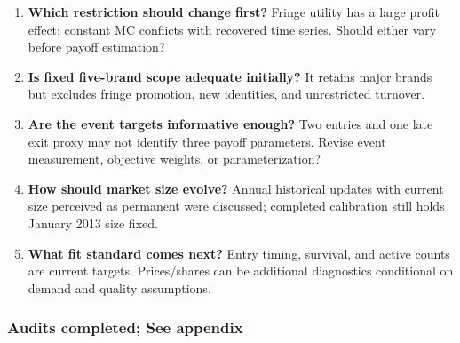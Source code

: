\documentclass[11pt,]{article}
\providecommand{\tightlist}{%
  \setlength{\itemsep}{0pt}\setlength{\parskip}{0pt}}
\begin{document}
\begin{enumerate}
\def\labelenumi{\arabic{enumi}.}
\tightlist
\item
  \textbf{Which restriction should change first?} Fringe utility has a
  large profit effect; constant MC conflicts with recovered time series.
  Should either vary before payoff estimation?
\item
  \textbf{Is fixed five-brand scope adequate initially?} It retains
  major brands but excludes fringe promotion, new identities, and
  unrestricted turnover.
\item
  \textbf{Are the event targets informative enough?} Two entries and one
  late exit proxy may not identify three payoff parameters. Revise event
  measurement, objective weights, or parameterization?
\item
  \textbf{How should market size evolve?} Annual historical updates with
  current size perceived as permanent were discussed; completed
  calibration still holds January 2013 size fixed.
\item
  \textbf{What fit standard comes next?} Entry timing, survival, and
  active counts are current targets. Prices/shares can be additional
  diagnostics conditional on demand and quality assumptions.
\end{enumerate}

\subsubsection{Audits completed; See
appendix}\label{audits-completed-see-appendix}
\end{document}
